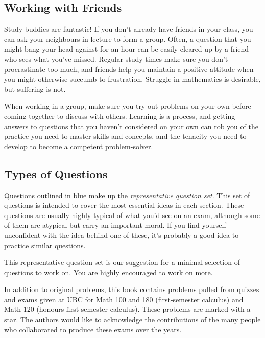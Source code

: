 \subsection*{Working with Friends}

Study buddies are fantastic! If you don't already have friends in your class, you can ask your neighbours in lecture to form a group. Often, a question that you might bang your head against for an hour can be easily cleared up by a friend who sees what you've missed. Regular study times make sure you don't procrastinate too much, and friends help you maintain a positive attitude when you might otherwise succumb to frustration. Struggle in mathematics is desirable, but suffering is not.

When working in a group, make sure you try out problems on your own before coming together to discuss with others. Learning is a process, and getting answers to questions that you haven't considered on your own can rob you of the practice you need to master skills and concepts, and the tenacity you need to develop to become a competent problem-solver.

\subsection*{Types of Questions}
\begin{Mquestion}%
Questions outlined in blue make up the \emph{representative question set}. This set of questions is intended to cover the most essential ideas in each section. These questions are usually highly typical of what you'd see on an exam, although some of them are atypical but carry an important moral. If you find yourself unconfident with the idea behind one of these, it's probably a good idea to practice similar questions.

This representative question set is our suggestion for a minimal selection of questions to work on.  You are highly encouraged to work on more.
\end{Mquestion}

\begin{question}[year]
In addition to original problems, this book contains problems pulled from quizzes and exams given at UBC for Math 100 and 180 (first-semester calculus) and Math 120 (honours first-semester calculus). These problems are marked with a star. The authors would like to acknowledge the contributions of the many people who collaborated to produce these exams over the years.
\end{question}

